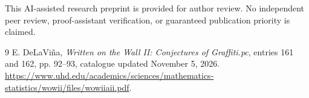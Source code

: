\documentclass[11pt]{article}
\begin{document}
This AI-assisted research preprint is provided for author review. No independent peer review, proof-assistant verification, or guaranteed publication priority is claimed.
\begin{thebibliography}{9}
 E. DeLaVi\~na, \emph{Written on the Wall II: Conjectures of Graffiti.pc}, entries 161 and 162, pp. 92--93, catalogue updated November 5, 2026. \url{https://www.uhd.edu/academics/sciences/mathematics-statistics/wowii/files/wowiiaii.pdf}.
\end{thebibliography}
\end{document}
